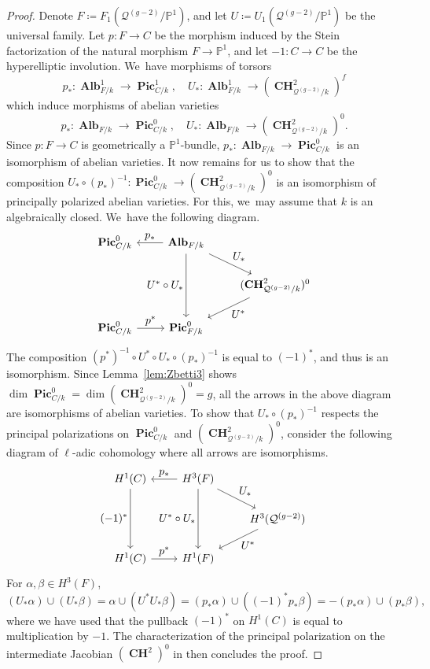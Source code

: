 \documentclass[JEP,XML,SOM,Unicode,NoEqCountersInSection,published]{cedram}
\let\ts\textstyle
\theoremstyle{plain}
\theoremstyle{definition}
\DeclareMathOperator{\bAlb}{\mathbf{Alb}}
\DeclareMathOperator{\bCH}{\mathbf{CH}}
\DeclareMathOperator{\bPic}{\mathbf{Pic}}
\renewcommand\P{\mathbb{P}}
\begin{document}
\begin{proof}
Denote $F \coloneqq F_1(\mathcal{Q}^{(g-2)}/\P^1)$, and let $U \coloneqq U_1(\mathcal{Q}^{(g-2)}/\P^1)$ be the universal family. Let $p\colon F\to C$ be the morphism induced by the Stein factorization of the natural morphism $F\to \P^1$,
and let $-1\colon C\to C$ be the hyperelliptic involution. We~have morphisms of torsors
\[
p_*\colon \bAlb_{F/k}^1\to \bPic_{C/k}^1, \quad
U_*\colon \bAlb_{F/k}^1\to (\bCH^2_{\mathcal{Q}^{(g-2)}/k})^f
\]
which induce morphisms of abelian varieties
\[
p_*\colon \bAlb_{F/k}\to \bPic_{C/k}^0, \quad
U_*\colon \bAlb_{F/k}\to (\bCH^2_{\mathcal{Q}^{(g-2)}/k})^0.
\]
Since $p\colon F\to C$ is geometrically a $\P^1$-bundle, $p_*\colon \bAlb_{F/k}\to \bPic_{C/k}^0$ is an isomorphism of abelian varieties.
It now remains for us to show that the composition
$U_*\circ (p_*)^{-1}\colon \bPic_{C/k}^0\to (\bCH^2_{\mathcal{Q}^{(g-2)}/k})^0$
is an isomorphism of principally polarized abelian varieties.
For this, we~may assume that $k$ is an algebraically closed. We~have the following diagram.
\[
\begin{tikzcd}
\bPic^0_{C/k} & \bAlb_{F/k} \arrow[l, "\ts p_*"'] \arrow[rd, "\ts U_*"] \arrow[dd, "\ts U^*\circ U_*"'] & \\
& & (\bCH^2_{\mathcal{Q}^{(g-2)}/k})^0 \arrow[ld, "\ts U^*"] \\
\bPic^0_{C/k} \arrow[r, "\ts p^*"] & \bPic_{F/k}^0 &
\end{tikzcd}
\]
The composition $(p^*)^{-1}\circ U^*\circ U_*\circ (p_*)^{-1}$ is equal to $(-1)^*$,
and thus is an isomorphism.
Since Lemma~\ref{lem:Zbetti3} shows
$\dim \bPic_{C/k}^0=\dim (\bCH^2_{\mathcal{Q}^{(g-2)}/k})^0=g$,
all the arrows in the above diagram are isomorphisms of abelian varieties.
To show that $U_*\circ (p_*)^{-1}$ respects the principal polarizations on $\bPic_{C/k}^0$ and $(\bCH^2_{\mathcal{Q}^{(g-2)}/k})^0$,
consider the following diagram of $\ell$-adic cohomology where all arrows are isomorphisms.
\[
\begin{tikzcd}
H^1(C) \arrow[dd, "\ts (-1)^*"'] & H^3(F) \arrow[l, "\ts p_*"'] \arrow[rd, "\ts U_*"] \arrow[dd, "\ts U^*\circ U_*"'] & \\
& & H^3(\mathcal{Q}^{(g-2)}) \arrow[ld, "\ts U^*"] \\
H^1(C) \arrow[r, "\ts p^*"] & H^1(F) &
\end{tikzcd}
\]
For $\alpha, \beta\in H^3(F)$,
\[
(U_*\alpha) \cup (U_*\beta) = \alpha\cup (U^*U_*\beta) = (p_*\alpha)\cup ((-1)^* p_*\beta) = - (p_*\alpha) \cup (p_*\beta),
\]
where we have used that the pullback $(-1)^*$ on $H^1(C)$ is equal to multiplication by $-1$.
The characterization of the principal polarization on the intermediate Jacobian \((\bCH^2)^0\) in \cite[Property 2.4, the following comments, and Identity (2.9)]{BW20} then concludes the proof.
\end{proof}
\end{document}
